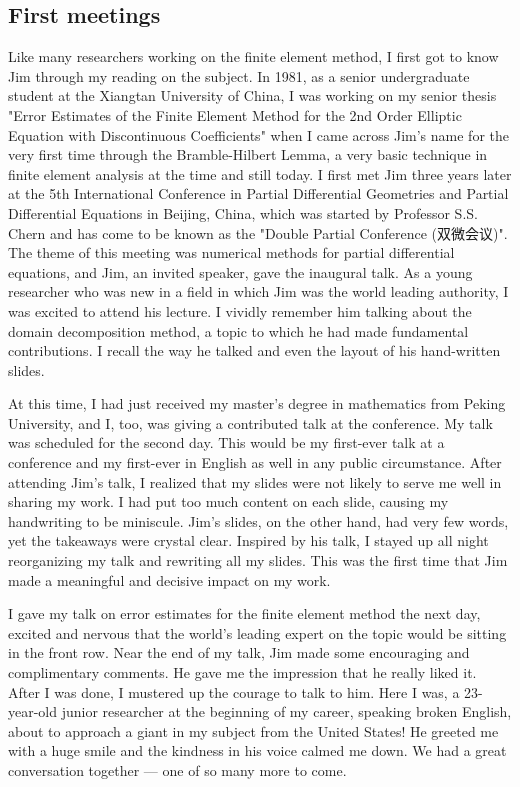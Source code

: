 \documentclass[CJK,11pt]{amsart}
\theoremstyle{definition}
\begin{document}
\begin{CJK*}{UTF8}{gbsn}
\section{First meetings}
Like many researchers working on the finite element method, I first got to know Jim through my reading on the subject. In 1981, as a senior undergraduate student at the Xiangtan University of China, I was working on my senior thesis "Error Estimates of the Finite Element Method for the 2nd Order Elliptic Equation with Discontinuous Coefficients" \cite{xu1982error} when I came across Jim's name for the very first time through the Bramble-Hilbert Lemma, a very basic technique in finite element analysis at the time and still today. 
I first met Jim three years later at the 5th International Conference in Partial Differential Geometries and Partial Differential Equations in Beijing, China, which was started by Professor S.S. Chern and has come to be known as the "Double Partial Conference (双微会议)". The theme of this meeting was numerical methods for partial differential equations, and Jim, an invited speaker, gave the inaugural talk. As a young researcher who was new in a field in which Jim was the world leading authority, I was excited to attend his lecture. I vividly remember him talking about the domain decomposition method, a topic to which he had made fundamental contributions. I recall the way he talked and even the layout of his hand-written slides.

At this time, I had just received my master's degree in mathematics from Peking University, and I, too, was giving a contributed talk at the conference.  My talk was scheduled for the second day. This would be my first-ever talk at a conference and my first-ever in English as well in any public circumstance. After attending Jim's talk, I realized that my slides were not likely to serve me well in sharing my work. I had put too much content on each slide, causing my handwriting to be miniscule. Jim's slides, on the other hand, had very few words, yet the takeaways were crystal clear. Inspired by his talk, I stayed up all night reorganizing my talk and rewriting all my slides. This was the first time that Jim made a meaningful and decisive impact on my work. 

I gave my talk on error estimates for the finite element method the next day, excited and nervous that the world's leading expert on the topic would be sitting in the front row. Near the end of my talk, Jim made some encouraging and complimentary comments. He gave me the impression that he really liked it. After I was done, I mustered up the courage to talk to him. Here I was, a 23-year-old junior researcher at the beginning of my career, speaking broken English, about to approach a giant in my subject from the United States! He greeted me with a huge smile and the kindness in his voice calmed me down. We had a great conversation together --- one of so many more to come. 


\end{CJK*}
\end{document}
